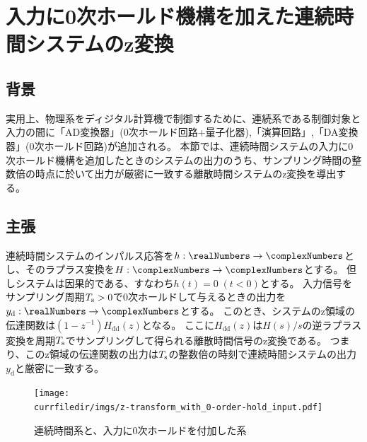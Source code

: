     \section{入力に0次ホールド機構を加えた連続時間システムのz変換}
        \subsection{背景}
            実用上、物理系をディジタル計算機で制御するために、連続系である制御対象と入力の間に「AD変換器」(0次ホールド回路+量子化器),「演算回路」,「DA変換器」(0次ホールド回路)が追加される。
            本節では、連続時間システムの入力に0次ホールド機構を追加したときのシステムの出力のうち、サンプリング時間の整数倍の時点に於いて出力が厳密に一致する離散時間システムのz変換を導出する。
        \subsection{主張}
            \renewcommand{\uH}{u_\text{H}}
            \newcommand{\ud}{u_\text{d}}
            \newcommand{\udd}{u_\text{dd}}
            \newcommand{\yd}{y_\text{d}}
            \newcommand{\ydd}{y_\text{dd}}
            \newcommand{\hd}{h_\text{d}}
            \newcommand{\hdd}{h_\text{dd}}
            \newcommand{\Ud}{U_\text{d}}
            \newcommand{\Udd}{U_\text{dd}}
            \newcommand{\Hd}{H_\text{d}}
            \newcommand{\Hdd}{H_\text{dd}}
            \newcommand{\Yd}{Y_\text{d}}
            \newcommand{\Ydd}{Y_\text{dd}}
            連続時間システムのインパルス応答を$h:\realNumbers\to\complexNumbers$とし、そのラプラス変換を$H:\complexNumbers\to\complexNumbers$とする。
            但しシステムは因果的である、すなわち$h(t)=0\;(t<0)$とする。
            入力信号をサンプリング周期$T_\text{s}>0$で0次ホールドして与えるときの出力を$\yd:\realNumbers\to\complexNumbers$とする。
            このとき、システムのz領域の伝達関数は$(1-z^{-1})\Hdd(z)$となる。
            ここに$\Hdd(z)$は$H(s)/s$の逆ラプラス変換を周期$T_\text{s}$でサンプリングして得られる離散時間信号のz変換である。
            つまり、このz領域の伝達関数の出力は$T_\text{s}$の整数倍の時刻で連続時間システムの出力$\yd$と厳密に一致する。
            \begin{figure}[H]
                \centering
                \texttt{[image: \\currfiledir/imgs/z-transform\_with\_0-order-hold\_input.pdf]}
                \caption{連続時間系と、入力に0次ホールドを付加した系}
            \end{figure}
